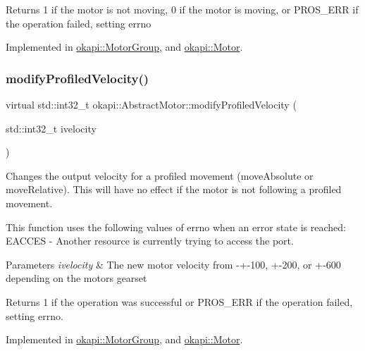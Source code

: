\begin{DoxyReturn}{Returns}
1 if the motor is not moving, 0 if the motor is moving, or P\+R\+O\+S\+\_\+\+E\+RR if the operation failed, setting errno 
\end{DoxyReturn}


Implemented in \mbox{\hyperlink{classokapi_1_1MotorGroup_a50dfcb9272ad53aa231119a523ad2f2e}{okapi\+::\+Motor\+Group}}, and \mbox{\hyperlink{classokapi_1_1Motor_ab4edaf8e4ed576fa2003d4cc8e02c364}{okapi\+::\+Motor}}.

\mbox{\label{classokapi_1_1AbstractMotor_a1d131cbf0b8a325a54034e540c3be6d2}} 
\subsubsection{\texorpdfstring{modifyProfiledVelocity()}{modifyProfiledVelocity()}}
{\footnotesize\ttfamily virtual std\+::int32\+\_\+t okapi\+::\+Abstract\+Motor\+::modify\+Profiled\+Velocity (\begin{DoxyParamCaption}\item[{std\+::int32\+\_\+t}]{ivelocity }\end{DoxyParamCaption})\hspace{0.3cm}{\ttfamily [pure virtual]}}

Changes the output velocity for a profiled movement (move\+Absolute or move\+Relative). This will have no effect if the motor is not following a profiled movement.

This function uses the following values of errno when an error state is reached\+: E\+A\+C\+C\+ES -\/ Another resource is currently trying to access the port.


\begin{DoxyParams}{Parameters}
{\em ivelocity} & The new motor velocity from -\/+-\/100, +-\/200, or +-\/600 depending on the motor\textquotesingle{}s gearset \\
\hline
\end{DoxyParams}
\begin{DoxyReturn}{Returns}
1 if the operation was successful or P\+R\+O\+S\+\_\+\+E\+RR if the operation failed, setting errno. 
\end{DoxyReturn}


Implemented in \mbox{\hyperlink{classokapi_1_1MotorGroup_a616f20db24f1eff4d3641b86faef4fbd}{okapi\+::\+Motor\+Group}}, and \mbox{\hyperlink{classokapi_1_1Motor_a8778f90005a3add64d0dfd7574fb8289}{okapi\+::\+Motor}}.

